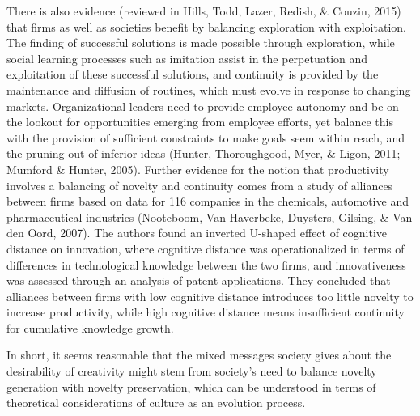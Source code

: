 \documentclass[a4paper,12pt,man,british]{apa6}
\begin{document}
There is also evidence (reviewed in Hills, Todd, Lazer, Redish, \& Couzin, 2015) that firms as well as societies benefit by balancing exploration with exploitation. The finding of successful solutions is made possible through exploration, while social learning processes such as imitation assist in the perpetuation and exploitation of these successful solutions, and continuity is provided by the maintenance and diffusion of routines, which must evolve in response to changing markets. 
Organizational leaders need to provide employee autonomy and be on the lookout for opportunities emerging from employee efforts, yet balance this with the provision of sufficient constraints to make goals seem within reach, and the pruning out of inferior ideas (Hunter, Thoroughgood, Myer, \& Ligon, 2011; Mumford \& Hunter, 2005). 
Further evidence for the notion that productivity involves a balancing of novelty and continuity comes from a study of alliances between firms based on data for 116 companies in the chemicals, automotive and pharmaceutical industries (Nooteboom, Van Haverbeke, Duysters, Gilsing, \& Van den Oord, 2007). The authors found an inverted U-shaped effect of cognitive distance on innovation, where cognitive distance was operationalized in terms of differences in technological knowledge between the two firms, and innovativeness was assessed through an analysis of patent applications.
They concluded that alliances between firms with low cognitive distance introduces too little novelty to increase productivity, while high cognitive distance means insufficient continuity for cumulative knowledge growth. 

In short, it seems reasonable that the mixed messages society gives about the desirability of creativity might stem from society's need to balance novelty generation with novelty preservation, which can be understood in terms of theoretical considerations of culture as an evolution process. 
\end{document}
